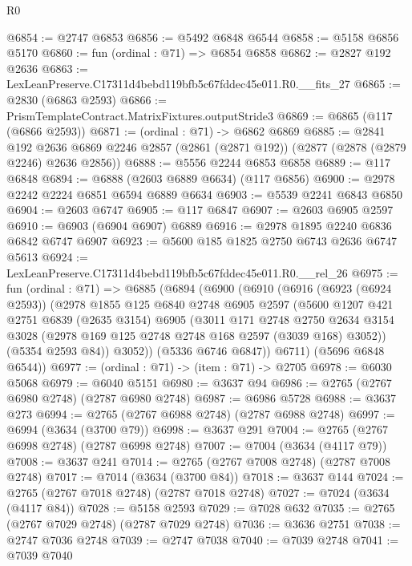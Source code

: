 \begin{lexlean}{R0}
\begin{coremodule}
@6854 := @2747 @6853
@6856 := @5492 @6848 @6544
@6858 := @5158 @6856 @5170
@6860 := fun (ordinal : @71) => @6854 @6858
@6862 := @2827 @192 @2636
@6863 := LexLeanPreserve.C17311d4bebd119bfb5c67fddec45e011.R0.__fits_27
@6865 := @2830 (@6863 @2593)
@6866 := PrismTemplateContract.MatrixFixtures.outputStride3
@6869 := @6865 (@117 (@6866 @2593))
@6871 := (ordinal : @71) -> @6862 @6869
@6885 := @2841
    @192
    @2636
    @6869
    @2246
    @2857
    (@2861 (@2871 @192))
    (@2877 (@2878 (@2879 @2246) @2636 @2856))
@6888 := @5556 @2244 @6853 @6858
@6889 := @117 @6848
@6894 := @6888 (@2603 @6889 @6634) (@117 @6856)
@6900 := @2978 @2242 @2224 @6851 @6594 @6889 @6634
@6903 := @5539 @2241 @6843 @6850
@6904 := @2603 @6747
@6905 := @117 @6847
@6907 := @2603 @6905 @2597
@6910 := @6903 (@6904 @6907) @6889
@6916 := @2978 @1895 @2240 @6836 @6842 @6747 @6907
@6923 := @5600 @185 @1825 @2750 @6743 @2636 @6747 @5613
@6924 := LexLeanPreserve.C17311d4bebd119bfb5c67fddec45e011.R0.__rel_26
@6975 := fun (ordinal : @71) =>
  @6885
    (@6894
      (@6900
        (@6910
          (@6916
            (@6923 (@6924 @2593))
            (@2978
              @1855
              @125
              @6840
              @2748
              @6905
              @2597
              (@5600
                @1207
                @421
                @2751
                @6839
                (@2635 @3154)
                @6905
                (@3011
                  @171
                  @2748
                  @2750
                  @2634
                  @3154
                  @3028
                  (@2978 @169 @125 @2748 @2748 @168 @2597 (@3039 @168) @3052))
                (@5354 @2593 @84))
              @3052))
          (@5336 @6746 @6847))
        @6711)
      (@5696 @6848 @6544))
@6977 := (ordinal : @71) -> (item : @71) -> @2705
@6978 := @6030 @5068
@6979 := @6040 @5151
@6980 := @3637 @94
@6986 := @2765 (@2767 @6980 @2748) (@2787 @6980 @2748)
@6987 := @6986 @5728
@6988 := @3637 @273
@6994 := @2765 (@2767 @6988 @2748) (@2787 @6988 @2748)
@6997 := @6994 (@3634 (@3700 @79))
@6998 := @3637 @291
@7004 := @2765 (@2767 @6998 @2748) (@2787 @6998 @2748)
@7007 := @7004 (@3634 (@4117 @79))
@7008 := @3637 @241
@7014 := @2765 (@2767 @7008 @2748) (@2787 @7008 @2748)
@7017 := @7014 (@3634 (@3700 @84))
@7018 := @3637 @144
@7024 := @2765 (@2767 @7018 @2748) (@2787 @7018 @2748)
@7027 := @7024 (@3634 (@4117 @84))
@7028 := @5158 @2593
@7029 := @7028 @632
@7035 := @2765 (@2767 @7029 @2748) (@2787 @7029 @2748)
@7036 := @3636 @2751
@7038 := @2747 @7036 @2748
@7039 := @2747 @7038
@7040 := @7039 @2748
@7041 := @7039 @7040

\end{coremodule}
\end{lexlean}
